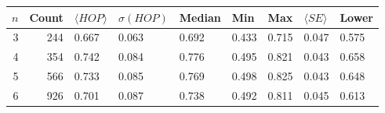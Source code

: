 \begin{tabular}{rrlllllll}
\toprule
$n$ & Count & $\langle HOP \rangle$ & $\sigma(HOP)$ & Median & Min & Max & $\langle SE \rangle$ & Lower \\
\midrule
3 & 244 & 0.667 & 0.063 & 0.692 & 0.433 & 0.715 & 0.047 & 0.575 \\
4 & 354 & 0.742 & 0.084 & 0.776 & 0.495 & 0.821 & 0.043 & 0.658 \\
5 & 566 & 0.733 & 0.085 & 0.769 & 0.498 & 0.825 & 0.043 & 0.648 \\
6 & 926 & 0.701 & 0.087 & 0.738 & 0.492 & 0.811 & 0.045 & 0.613 \\
\bottomrule
\end{tabular}
